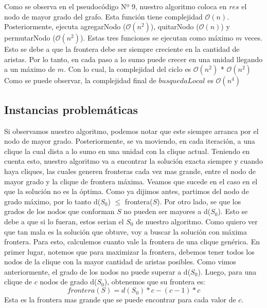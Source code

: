 \begin{itemize}
Como se observa en el pseudocódigo Nº 9, nuestro algoritmo coloca en $res$ el nodo de mayor grado del grafo. Esta función tiene complejidad $\mathcal{O}(n)$. Posteriormente, ejecuta agregarNodo ($\mathcal{O}(n^{2})$), quitarNodo ($\mathcal{O}(n)$) y permutarNodo ($\mathcal{O}(n^{2})$). Estas tres funciones se ejecutan como máximo $m$ veces. Esto se debe a que la frontera debe ser siempre creciente en la cantidad de aristas. Por lo tanto, en cada paso a lo sumo puede crecer en una unidad llegando a un máximo de $m$. Con lo cual, la complejidad del ciclo es $\mathcal{O}(n^{2})$ * $\mathcal{O}(n^{2})$
\newline
Como se puede observar, la complejidad final de $busquedaLocal$ es $\mathcal{O}(n^{4})$

\subsection{Instancias problemáticas}
Si observamos nuestro algoritmo, podemos notar que este siempre arranca por el nodo de mayor grado. Posteriormente, se va moviendo, en cada iteración, a una clique la cual dista a lo sumo en una unidad con la clique actual. Teniendo en cuenta esto, nuestro algoritmo va a encontrar la solución exacta siempre y cuando haya cliques, las cuales generen fronteras cada vez mas grande, entre el nodo de mayor grado y la clique de frontera máxima.
\newline
Veamos que sucede en el caso en el que la solución no es la óptima. Como ya dijimos antes, partimos del nodo de grado máximo, por lo tanto d($S_{0}$) $\leq$ frontera($S$). Por otro lado, se que los grados de los nodos que conforman $S$ no pueden ser mayores a d($S_{0}$). Esto se debe a que si lo fueran, estos serian el $S_{0}$ de nuestro algoritmo. Como quiero ver que tan mala es la solución que obtuve, voy a buscar la solución con máxima frontera. Para esto, calculemos cuanto vale la frontera de una clique genérica. \newline
En primer lugar, notemos que para maximizar la frontera, debemos tener todos los nodos de la clique con la mayor cantidad de aristas posibles. Como vimos anteriormente, el grado de los nodos no puede superar a d($S_{0}$). Luego, para una clique de $c$ nodos de grado d($S_{0}$), obtenemos que su frontera es:
\begin{equation}
  frontera(S) = d(S_{0}) * c - (c - 1) * c
\end{equation} 
Esta es la frontera mas grande que se puede encontrar para cada valor de $c$.
\newline 

\end{itemize}
